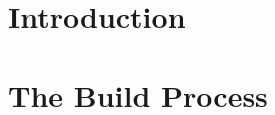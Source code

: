 \documentclass[12pt,a4paper,oneside,onecolumn]{book}
\theoremstyle{nonumberplain}
\theoremstyle{plain}
\begin{document}
\begingroup
  \makeatletter\let\ps@plain\ps@empty\makeatother
  
  
\endgroup

\makeatletter
\let\orig@cleardoublepage\cleardoublepage
\let\cleardoublepage\clearpage
\frontmatter
\let\cleardoublepage\orig@cleardoublepage
\makeatother
{}

{}



\setcounter{tocdepth}{2}
\tableofcontents
\clearpage

\mainmatter

\cleardoublepage
{}
\hypertarget{chapter:intro}{}%
\chapter{Introduction}
\label{chapter:intro}


\cleardoublepage
{}
\hypertarget{chapter:build}{}%
\chapter{The Build Process}
\label{chapter:build}

\end{document}
